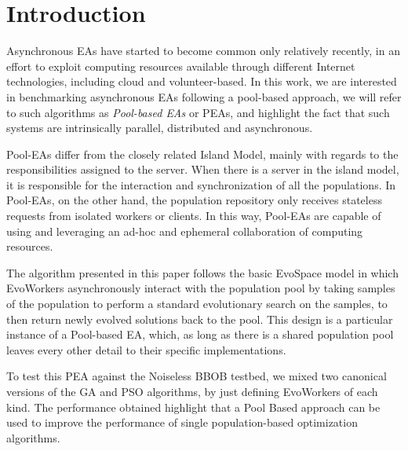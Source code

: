 \documentclass[sigconf]{acmart}
\begin{document}


\maketitle


\section{Introduction}
Asynchronous EAs \cite{Jini:FEA2000,alba2001analyzing,jj:2008:PPSN} have
started to become common only relatively recently, in an effort to 
exploit computing resources available through different Internet technologies,
including cloud and volunteer-based. In this work, we are
interested in benchmarking asynchronous EAs following a pool-based 
approach, we will refer to such algorithms as {\em Pool-based EAs} 
or PEAs, and highlight the fact that such systems are 
intrinsically parallel, distributed and asynchronous.


Pool-EAs differ from the closely related Island Model, mainly with regards to
the responsibilities assigned to the server. When there is a server in the
island model, it is responsible for the interaction and synchronization of all
the populations. In Pool-EAs, on the other hand, the population repository only
receives stateless requests from isolated workers or clients. In this way,
Pool-EAs are capable of using and leveraging an ad-hoc and ephemeral
collaboration of computing resources.

The algorithm presented in this paper follows the basic  EvoSpace model
\cite{GValdez2015} in which EvoWorkers  asynchronously interact with the
population pool by taking samples of the population to perform a standard
evolutionary search on the samples, to then return newly evolved solutions back
to the pool. This design is a particular instance of a Pool-based EA, which, as
long as there is a shared population pool leaves every other detail to their
specific implementations.


To test this PEA against the Noiseless BBOB testbed, 
we mixed two canonical versions of the GA and PSO algorithms, 
by just defining EvoWorkers of each kind. The performance 
obtained highlight 
that a Pool Based approach can be used to improve the performance 
of single population-based optimization algorithms.
\end{document}
